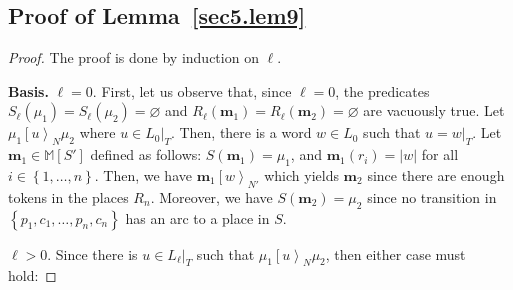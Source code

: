 \documentclass{fsttcs}
\def\set#1{{\left\{ #1 \right\}}}
\newcommand{\multiset}[1]{{\mathbb{M}[ #1 ]}}
\def\mmap{\mathbf{m}}
\newcommand{\fire}[1]{\left[ {#1}\right\rangle}
\begin{document}
\subsection{Proof of Lemma~\ref{sec5.lem9}}

\begin{proof} The proof is done by induction on $\ell$.

\medskip

\noindent
{\bf Basis.} $\ell=0$. First, let us observe that, since \(\ell=0\), the predicates
\(S_{\ell}(\mu_1)=S_{\ell}(\mu_2)=\varnothing\) and \(R_{\ell}(\mmap_1)=R_{\ell}(\mmap_2)=\varnothing\)
are vacuously true. Let $\mu_1 \fire{u}_N \mu_2$ where $u \in {L_0|_T}$. Then, there is a word $w \in L_0$ such
that $u=w|_T$. Let $\mmap_1\in\multiset{S'}$ defined as follows:
$S(\mmap_1)=\mu_1$, and $\mmap_1(r_i)=|w|$ for all $i \in \set{1,\ldots,n}$.
Then, we have $\mmap_1\fire{w}_{N'}$ which yields $\mmap_2$ since there are enough
tokens in the places $R_{n}$. Moreover, we have $S(\mmap_2)=\mu_2$ since no
transition in $\set{p_1,c_1,\ldots,p_n,c_n}$ has an arc to a place in $S$.

\medskip

 $\ell>0$.  Since there is $u \in
{L_\ell|_T}$ such that $\mu_1 \fire{u}_{N} \mu_2$, then either case must hold: 


\end{proof}
\end{document}
